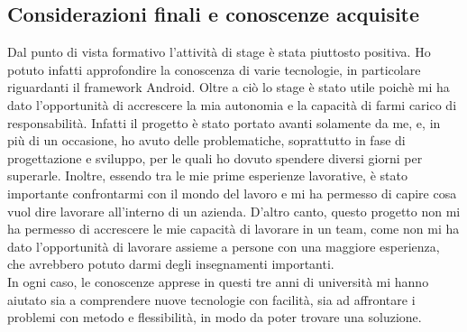 \documentclass[../Tesi.tex]{subfiles}
\begin{document}
	\subsection{Considerazioni finali e conoscenze acquisite}
	Dal punto di vista formativo l'attività di stage è stata piuttosto positiva. Ho potuto infatti approfondire la conoscenza di varie tecnologie, in particolare riguardanti il framework Android. Oltre a ciò lo stage è stato utile poichè mi ha dato l'opportunità di accrescere la mia autonomia e la capacità di farmi carico di responsabilità. Infatti il progetto è stato portato avanti solamente da me, e, in più di un occasione, ho avuto delle problematiche, soprattutto in fase di progettazione e sviluppo, per le quali ho dovuto spendere diversi giorni per superarle. Inoltre, essendo tra le mie prime esperienze lavorative, è stato importante confrontarmi con il mondo del lavoro e mi ha permesso di capire cosa vuol dire lavorare all'interno di un azienda. D'altro canto, questo progetto non mi ha permesso di accrescere le mie capacità di lavorare in un team, come non mi ha dato l'opportunità di lavorare assieme a persone con una maggiore esperienza, che avrebbero potuto darmi degli insegnamenti importanti.\\
	In ogni caso, le conoscenze apprese in questi tre anni di università mi hanno aiutato sia a comprendere nuove tecnologie con facilità, sia ad affrontare i problemi con metodo e flessibilità, in modo da poter trovare una soluzione. 
\end{document}

